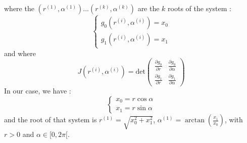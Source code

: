 where the $(r^{(1)}, \alpha^{(1)})...(r^{(k)}, \alpha^{(k)})$ are the $k$ roots of the system : 
$$
\begin{cases}
    g_0(r^{(i)}, \alpha^{(i)}) = x_0 \\
    g_1(r^{(i)}, \alpha^{(i)}) = x_1
\end{cases}
$$
and where
$$
J(r^{(i)}, \alpha^{(i)}) = \text{det}\begin{pmatrix}
    \frac{\partial g_0}{\partial r} & \frac{\partial g_0}{\partial \alpha} \\
    \frac{\partial g_1}{\partial r} & \frac{\partial g_1}{\partial \alpha}
\end{pmatrix}
$$
In our case, we have :
$$
\begin{cases}
    x_0 = r \cos{\alpha}\\
    x_1 = r \sin{\alpha}
\end{cases}
$$
and the root of that system is $r^{(1)} = \sqrt{x_0^2 + x_1^2}$, $\alpha^{(1)} = \arctan(\frac{x_1}{x_0})$, with $r > 0$ and $\alpha \in [0, 2\pi[$.
